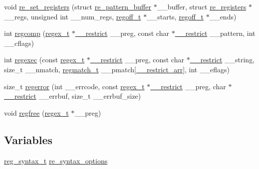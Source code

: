 \begin{DoxyCompactItemize}
\item 
void \hyperlink{a00092_af11ebb49eb67fe216d9adabe548dc951}{re\+\_\+set\+\_\+registers} (struct \hyperlink{a00686}{re\+\_\+pattern\+\_\+buffer} $\ast$\+\_\+\+\_\+buffer, struct \hyperlink{a00690}{re\+\_\+registers} $\ast$\+\_\+\+\_\+regs, unsigned int \+\_\+\+\_\+num\+\_\+regs, \hyperlink{a00092_a5b34995b47432512ee4ffa32b836e65f}{regoff\+\_\+t} $\ast$\+\_\+\+\_\+starts, \hyperlink{a00092_a5b34995b47432512ee4ffa32b836e65f}{regoff\+\_\+t} $\ast$\+\_\+\+\_\+ends)
\item 
int \hyperlink{a00092_a430f0c9389ac6c08be2286257691317b}{regcomp} (\hyperlink{a00092_a159f97bcead74ee31a0817571f7625a9}{regex\+\_\+t} $\ast$\hyperlink{a00092_a4127c12268159bf73f8e69b23c34c610}{\+\_\+\+\_\+restrict} \+\_\+\+\_\+preg, const char $\ast$\hyperlink{a00092_a4127c12268159bf73f8e69b23c34c610}{\+\_\+\+\_\+restrict} \+\_\+\+\_\+pattern, int \+\_\+\+\_\+cflags)
\item 
int \hyperlink{a00092_a179877eb45bb29da01e5101325554d73}{regexec} (const \hyperlink{a00092_a159f97bcead74ee31a0817571f7625a9}{regex\+\_\+t} $\ast$\hyperlink{a00092_a4127c12268159bf73f8e69b23c34c610}{\+\_\+\+\_\+restrict} \+\_\+\+\_\+preg, const char $\ast$\hyperlink{a00092_a4127c12268159bf73f8e69b23c34c610}{\+\_\+\+\_\+restrict} \+\_\+\+\_\+string, size\+\_\+t \+\_\+\+\_\+nmatch, \hyperlink{a00694}{regmatch\+\_\+t} \+\_\+\+\_\+pmatch\mbox{[}\hyperlink{a00092_abfb71cf90d227d4c3df733e5ac3c8e82}{\+\_\+\+\_\+restrict\+\_\+arr}\mbox{]}, int \+\_\+\+\_\+eflags)
\item 
size\+\_\+t \hyperlink{a00092_a0284fc25f2802396427939f37caccc1c}{regerror} (int \+\_\+\+\_\+errcode, const \hyperlink{a00092_a159f97bcead74ee31a0817571f7625a9}{regex\+\_\+t} $\ast$\hyperlink{a00092_a4127c12268159bf73f8e69b23c34c610}{\+\_\+\+\_\+restrict} \+\_\+\+\_\+preg, char $\ast$\hyperlink{a00092_a4127c12268159bf73f8e69b23c34c610}{\+\_\+\+\_\+restrict} \+\_\+\+\_\+errbuf, size\+\_\+t \+\_\+\+\_\+errbuf\+\_\+size)
\item 
void \hyperlink{a00092_a87e79b6d048a32ffbfdb234c4166e769}{regfree} (\hyperlink{a00092_a159f97bcead74ee31a0817571f7625a9}{regex\+\_\+t} $\ast$\+\_\+\+\_\+preg)
\end{DoxyCompactItemize}
\subsection*{Variables}
\begin{DoxyCompactItemize}
\item 
\hyperlink{a00092_a7e0565199a2fabaca3d67a5a44fc4229}{reg\+\_\+syntax\+\_\+t} \hyperlink{a00092_abdc5e67bbb6a48b740a95aef2bc3f5f2}{re\+\_\+syntax\+\_\+options}
\end{DoxyCompactItemize}


